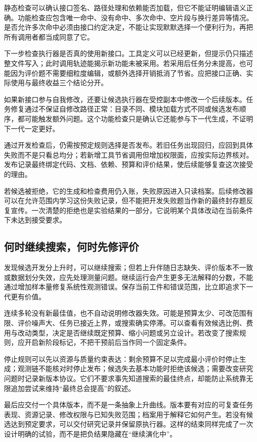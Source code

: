 静态检查可以确认接口签名、路径处理和依赖能否加载，但它不能证明编辑语义正确。功能检查应包含唯一命中、没有命中、多次命中、空片段与换行差异等情况。是否允许多次命中必须由接口约定决定，不能让实现默默选择一个便利行为，再把所有调用者都当成同意了它。

下一步检查执行器是否真的使用新接口。工具定义可以已经更新，但提示仍只描述整文件写入；此时调用轨迹能揭示新功能未被采用。若采用后任务分未提高，也可能因为评价题不需要细粒度编辑，或额外选择开销抵消了节省。应把接口正确、实际使用与最终收益三个结论分开。

如果新接口参与自我修改，还要让候选执行器在受控副本中修改一个后续版本。任务修复通过不保证自修改路径正常：目录不同、模块加载方式不同或候选发布顺序，都可能触发额外问题。这个功能检查只是确认它还能参与下一代生成，不证明下一代一定更好。

通过开发检查后，仍需按预定规则选择是否发布。若旧任务出现回归，应回到具体失败而不是只看总均分；若新增工具节省调用但增加权限面，应按实际边界核对。发布记录最终绑定代码、文档、依赖、预算和评价结果，使后续能够复查这次接受的理由。

若候选被拒绝，它的生成和检查费用仍入账，失败原因进入只读档案。后续修改器可以在允许范围内学习这份失败记录，但不能把开发失败题当作新的最终封存题反复宣传。一次清楚的拒绝也是实验结果的一部分，它说明某个具体改动在当前条件下未达到接受要求。

\subsection{何时继续搜索，何时先修评价}
\label{sec:ch12-stopping}

发现候选开发分上升时，可以继续搜索；但若上升伴随日志缺失、评价版本不一致或数据划分失效，应先处理测量问题。继续运行会产生更多无法解释的分数，不能通过增加样本量修复系统性观测错误。保存当前工件和错误范围，比立即追求下一代更有价值。

连续多轮没有新最佳值，也不自动说明修改器失效。可能是预算太少、可改范围有限、评价噪声大、任务已接近上界，或搜索确实停滞。可以查看有效候选比例、费用与改动类型，决定是否继续既定预算、缩小问题或另立设计。若改变了搜索规则，应开启新阶段标记，不把干预前后当作同一个固定条件。

停止规则可以先以资源与质量约束表达：剩余预算不足以完成最小评价时停止生成；观测链不能核对时停止发布；候选失去基本功能时拒绝该候选；需要改变研究问题时记录新版本协议。它们不要求事先知道搜索的最佳终点，却能防止系统靠无限追加尝试来维持“最终总会提高”的叙述。

最后应交付一个具体版本，而不是一条抽象上升曲线。版本要有对应的可复查任务表现、资源记录、修改权限与已知失败范围；档案用于解释它如何产生。若没有候选达到预定要求，可以交付研究记录并保留原执行器。这样的结束同样完成了一次设计明确的试验，而不是把负结果隐藏在“继续演化中”。


